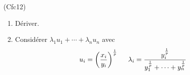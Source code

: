\begin{tiny}(Cfc12)\end{tiny} 
\begin{enumerate}
 \item Dériver.
 \item Considérer $\lambda_1u_1+\cdots+\lambda_nu_n$ avec
\begin{displaymath}
 u_i=\left( \frac{x_i}{y_i}\right)^{\frac{1}{p}}\hspace{0.5cm}
\lambda_i = \frac{y_i^{\frac{1}{p}}}{y_1^{\frac{1}{p}}+\cdots+y_n^{\frac{1}{p}}} 
\end{displaymath}

\end{enumerate}
